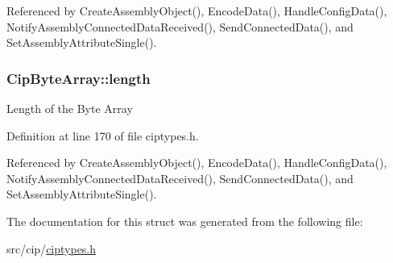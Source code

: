 \-Referenced by \-Create\-Assembly\-Object(), \-Encode\-Data(), \-Handle\-Config\-Data(), \-Notify\-Assembly\-Connected\-Data\-Received(), \-Send\-Connected\-Data(), and \-Set\-Assembly\-Attribute\-Single().

\hypertarget{structCipByteArray_a2fc468bacd1d1300da4286bb838b7f7b}{
\subsubsection[{length}]{ {\bf \-Cip\-Byte\-Array\-::length}}}\label{de/dd7/structCipByteArray_a2fc468bacd1d1300da4286bb838b7f7b}
\-Length of the \-Byte \-Array 

\-Definition at line 170 of file ciptypes.\-h.



\-Referenced by \-Create\-Assembly\-Object(), \-Encode\-Data(), \-Handle\-Config\-Data(), \-Notify\-Assembly\-Connected\-Data\-Received(), \-Send\-Connected\-Data(), and \-Set\-Assembly\-Attribute\-Single().



\-The documentation for this struct was generated from the following file\-:\begin{DoxyCompactItemize}
\item 
src/cip/\hyperlink{ciptypes_8h}{ciptypes.\-h}\end{DoxyCompactItemize}
